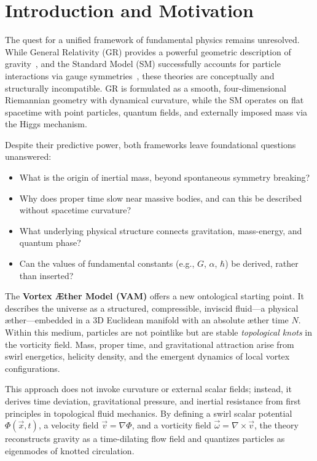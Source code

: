 \section{Introduction and Motivation}

    The quest for a unified framework of fundamental physics remains unresolved. While General Relativity (GR) provides a powerful geometric description of gravity~\cite{einstein1915gr}, and the Standard Model (SM) successfully accounts for particle interactions via gauge symmetries~\cite{weinberg1995quantum}, these theories are conceptually and structurally incompatible. GR is formulated as a smooth, four-dimensional Riemannian geometry with dynamical curvature, while the SM operates on flat spacetime with point particles, quantum fields, and externally imposed mass via the Higgs mechanism.

    Despite their predictive power, both frameworks leave foundational questions unanswered:
    \begin{itemize}
        \item What is the origin of inertial mass, beyond spontaneous symmetry breaking?
        \item Why does proper time slow near massive bodies, and can this be described without spacetime curvature?
        \item What underlying physical structure connects gravitation, mass-energy, and quantum phase?
        \item Can the values of fundamental constants (e.g., $G$, $\alpha$, $\hbar$) be derived, rather than inserted?
    \end{itemize}

    The \textbf{Vortex \AE ther Model (VAM)} offers a new ontological starting point. It describes the universe as a structured, compressible, inviscid fluid---a physical \ae ther---embedded in a 3D Euclidean manifold with an absolute æther time $N$. Within this medium, particles are not pointlike but are stable \textit{topological knots} in the vorticity field. Mass, proper time, and gravitational attraction arise from swirl energetics, helicity density, and the emergent dynamics of local vortex configurations.

    This approach does not invoke curvature or external scalar fields; instead, it derives time deviation, gravitational pressure, and inertial resistance from first principles in topological fluid mechanics. By defining a swirl scalar potential $\Phi(\vec{x},t)$, a velocity field $\vec{v} = \nabla \Phi$, and a vorticity field $\vec{\omega} = \nabla \times \vec{v}$, the theory reconstructs gravity as a time-dilating flow field and quantizes particles as eigenmodes of knotted circulation.

